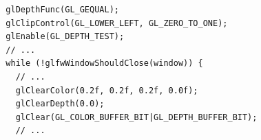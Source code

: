 \documentclass[calcdimensions,landscape,letterpaper]{powersem}
\newcommand{\thecurrentheading}{}
\newcommand{\heading}[1]{\renewcommand{\thecurrentheading}{#1}}
\begin{document}
\begin{slide}
    \heading{Enable Depth Testing}
    \begin{center}
        \begin{minipage}[c]{.8\textwidth}
            \begin{verbatim}
  glDepthFunc(GL_GEQUAL);
  glClipControl(GL_LOWER_LEFT, GL_ZERO_TO_ONE);
  glEnable(GL_DEPTH_TEST);
  // ...
  while (!glfwWindowShouldClose(window)) {
    // ...
    glClearColor(0.2f, 0.2f, 0.2f, 0.0f);
    glClearDepth(0.0);
    glClear(GL_COLOR_BUFFER_BIT|GL_DEPTH_BUFFER_BIT);
    // ...
            \end{verbatim}
        \end{minipage}
    \end{center}
\end{slide}
\end{document}
